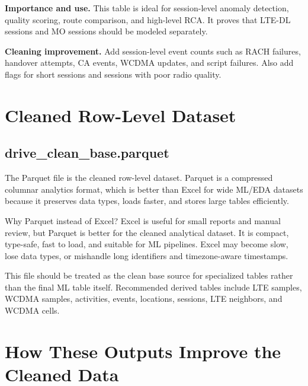 \documentclass[12pt,a4paper]{article}
\begin{document}
\textbf{Importance and use.} This table is ideal for session-level anomaly detection, quality scoring, route comparison, and high-level RCA. It proves that LTE-DL sessions and MO sessions should be modeled separately.

\textbf{Cleaning improvement.} Add session-level event counts such as RACH failures, handover attempts, CA events, WCDMA updates, and script failures. Also add flags for short sessions and sessions with poor radio quality.


\section{Cleaned Row-Level Dataset}

\subsection{drive\_clean\_base.parquet}
The Parquet file is the cleaned row-level dataset. Parquet is a compressed columnar analytics format, which is better than Excel for wide ML/EDA datasets because it preserves data types, loads faster, and stores large tables efficiently.

\begin{infobox}{Why Parquet instead of Excel?}
Excel is useful for small reports and manual review, but Parquet is better for the cleaned analytical dataset. It is compact, type-safe, fast to load, and suitable for ML pipelines. Excel may become slow, lose data types, or mishandle long identifiers and timezone-aware timestamps.
\end{infobox}

This file should be treated as the clean base source for specialized tables rather than the final ML table itself. Recommended derived tables include LTE samples, WCDMA samples, activities, events, locations, sessions, LTE neighbors, and WCDMA cells.


\section{How These Outputs Improve the Cleaned Data}
\end{document}
